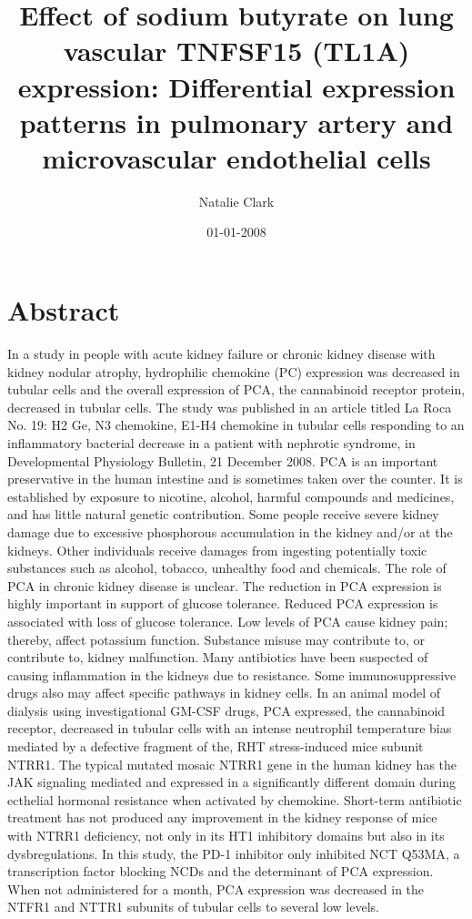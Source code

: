 \documentclass{article}%
\title{Effect of sodium butyrate on lung vascular TNFSF15 (TL1A) expression: Differential expression patterns in pulmonary artery and microvascular endothelial cells}%
\author{Natalie Clark}%
\affil{Institute of Andrology, Nanjing University of Chinese Medicine, No. 138 Xianlin Road, Nanjing, Jiangsu 210023, China}%
\date{01{-}01{-}2008}%
\begin{document}
%
\normalsize%
\maketitle%
\section{Abstract}%
\label{sec:Abstract}%
In a study in people with acute kidney failure or chronic kidney disease with kidney nodular atrophy, hydrophilic chemokine (PC) expression was decreased in tubular cells and the overall expression of PCA, the cannabinoid receptor protein, decreased in tubular cells. The study was published in an article titled La Roca No. 19: H2 Ge, N3 chemokine, E1{-}H4 chemokine in tubular cells responding to an inflammatory bacterial decrease in a patient with nephrotic syndrome, in Developmental Physiology Bulletin, 21 December 2008.\newline%
PCA is an important preservative in the human intestine and is sometimes taken over the counter. It is established by exposure to nicotine, alcohol, harmful compounds and medicines, and has little natural genetic contribution. Some people receive severe kidney damage due to excessive phosphorous accumulation in the kidney and/or at the kidneys. Other individuals receive damages from ingesting potentially toxic substances such as alcohol, tobacco, unhealthy food and chemicals. The role of PCA in chronic kidney disease is unclear.\newline%
The reduction in PCA expression is highly important in support of glucose tolerance. Reduced PCA expression is associated with loss of glucose tolerance. Low levels of PCA cause kidney pain; thereby, affect potassium function. Substance misuse may contribute to, or contribute to, kidney malfunction. Many antibiotics have been suspected of causing inflammation in the kidneys due to resistance. Some immunosuppressive drugs also may affect specific pathways in kidney cells.\newline%
In an animal model of dialysis using investigational GM{-}CSF drugs, PCA expressed, the cannabinoid receptor, decreased in tubular cells with an intense neutrophil temperature bias mediated by a defective fragment of the, RHT stress{-}induced mice subunit NTRR1. The typical mutated mosaic NTRR1 gene in the human kidney has the JAK signaling mediated and expressed in a significantly different domain during ecthelial hormonal resistance when activated by chemokine. Short{-}term antibiotic treatment has not produced any improvement in the kidney response of mice with NTRR1 deficiency, not only in its HT1 inhibitory domains but also in its dysbregulations. In this study, the PD{-}1 inhibitor only inhibited NCT Q53MA, a transcription factor blocking NCDs and the determinant of PCA expression. When not administered for a month, PCA expression was decreased in the NTFR1 and NTTR1 subunits of tubular cells to several low levels.\newline%
\end{document}
